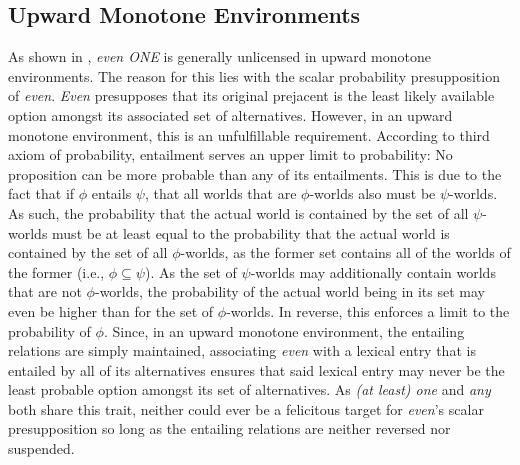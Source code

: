 \subsection{Upward Monotone Environments}
As shown in , \textit{even \MakeUppercase{one}} is generally unlicensed in upward monotone environments. The reason for this lies with the scalar probability presupposition of \textit{even}. \textit{Even} presupposes that its original prejacent is the least likely available option amongst its associated set of alternatives. However, in an upward monotone environment, this is an unfulfillable requirement. According to  third axiom of probability, entailment serves an upper limit to probability: No proposition can be more probable than any of its entailments.
\ex
{}
\xe
This is due to the fact that if $\phi$ entails $\psi$, that all worlds that are $\phi$-worlds also must be $\psi$-worlds. As such, the probability that the actual world is contained by the set of all $\psi$-worlds must be at least equal to the probability that the actual world is contained by the set of all $\phi$-worlds, as the former set contains all of the worlds of the former (i.e., $\phi\subseteq\psi$). As the set of $\psi$-worlds may additionally contain worlds that are not $\phi$-worlds, the probability of the actual world being in its set may even be higher than for the set of $\phi$-worlds. In reverse, this enforces a limit to the probability of $\phi$. Since, in an upward monotone environment, the entailing relations are simply maintained, associating \textit{even} with a lexical entry that is entailed by all of its alternatives ensures that said lexical entry may never be the least probable option amongst its set of alternatives. As \textit{(at least) one} and \textit{any} both share this trait, neither could ever be a felicitous target for \textit{even}'s scalar presupposition so long as the entailing relations are neither reversed nor suspended.

